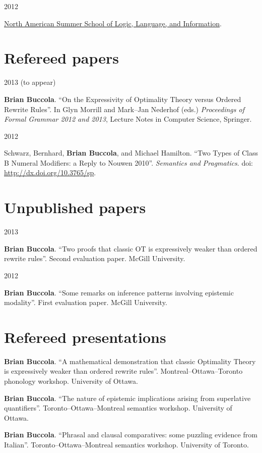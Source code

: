 \documentclass[11pt,letterpaper]{article}
\newcommand{\name}{Brian Buccola}
\newcommand{\cvitem}[2]{%
  \begin{minipage}[t]{0.24\textwidth}
    #1 %
  \end{minipage}
  \hfill
  \begin{minipage}[t]{0.74\textwidth}
    #2 %
  \end{minipage}
}
\begin{document}
\cvitem{2012 \shortmonthname[6]}{\href{http://nasslli2012.com/about}{North
American Summer School of Logic, Language, and Information}.}



\section*{Refereed papers}

\cvitem{2013 {\footnotesize (to appear)}}{\textbf{\name}. ``On the Expressivity
of Optimality Theory versus Ordered Rewrite Rules''. In Glyn Morrill and
Mark--Jan Nederhof (eds.) \textit{Proceedings of Formal Grammar 2012 and
2013}, Lecture Notes in Computer Science, Springer.}

\cvitem{2012}{Schwarz, Bernhard, \textbf{\name}, and Michael Hamilton. ``Two
Types of Class B Numeral Modifiers: a Reply to Nouwen 2010''. \textit{Semantics
and Pragmatics}. doi: \url{http://dx.doi.org/10.3765/sp}.}



\section*{Unpublished papers}

\cvitem{2013}{\textbf{\name}. ``Two proofs that classic OT is expressively
weaker than ordered rewrite rules''. Second evaluation paper. McGill
University.}

\cvitem{2012}{\textbf{\name}. ``Some remarks on inference patterns involving
epistemic modality''. First evaluation paper. McGill University.}



\section*{Refereed presentations}

\cvitem{}{\textbf{\name}. ``A mathematical
demonstration that classic Optimality Theory is expressively weaker than
ordered rewrite rules''. Montreal--Ottawa--Toronto phonology workshop.
University of Ottawa.}

\cvitem{}{\textbf{\name}. ``The nature of epistemic
implications arising from superlative quantifiers''. Toronto--Ottawa--Montreal
semantics workshop. University of Ottawa.}

\cvitem{}{\textbf{\name}. ``Phrasal and clausal
comparatives: some puzzling evidence from Italian''. Toronto--Ottawa--Montreal
semantics workshop.  University of Toronto.}
\end{document}
